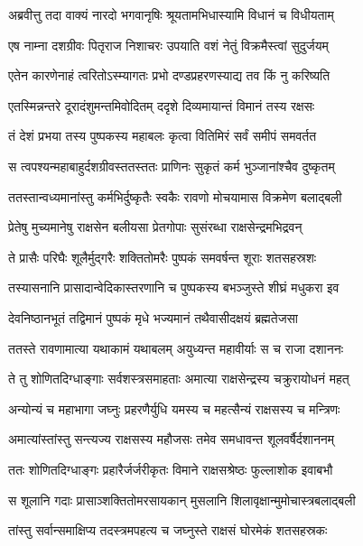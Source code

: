 \twolineshloka
{अब्रवीत्तु तदा वाक्यं नारदो भगवानृषिः}
{श्रूयतामभिधास्यामि विधानं च विधीयताम्} %

\twolineshloka
{एष नाम्ना दशग्रीवः पितृराज निशाचरः}
{उपयाति वशं नेतुं विक्रमैस्त्वां सुदुर्जयम्} %

\twolineshloka
{एतेन कारणेनाहं त्वरितोऽस्म्यागतः प्रभो}
{दण्डप्रहरणस्याद्य तव किं नु करिष्यति} %

\twolineshloka
{एतस्मिन्नन्तरे दूरादंशुमन्तमिवोदितम्}
{ददृशे दिव्यमायान्तं विमानं तस्य रक्षसः} %

\twolineshloka
{तं देशं प्रभया तस्य पुष्पकस्य महाबलः}
{कृत्वा वितिमिरं सर्वं समीपं समवर्तत} %

\twolineshloka
{स त्वपश्यन्महाबाहुर्दशग्रीवस्ततस्ततः}
{प्राणिनः सुकृतं कर्म भुञ्जानांश्चैव दुष्कृतम्} %

\twolineshloka
{ततस्तान्वध्यमानांस्तु कर्मभिर्दुष्कृतैः स्वकैः}
{रावणो मोचयामास विक्रमेण बलाद्बली} %

\twolineshloka
{प्रेतेषु मुच्यमानेषु राक्षसेन बलीयसा}
{प्रेतगोपाः सुसंरब्धा राक्षसेन्द्रमभिद्रवन्} %

\twolineshloka
{ते प्रासैः परिघैः शूलैर्मुद्गरैः शक्तितोमरैः}
{पुष्पकं समवर्षन्त शूराः शतसहस्रशः} %

\twolineshloka
{तस्यासनानि प्रासादान्वेदिकास्तरणानि च}
{पुष्पकस्य बभञ्जुस्ते शीघ्रं मधुकरा इव} %

\twolineshloka
{देवनिष्ठानभूतं तद्विमानं पुष्पकं मृधे}
{भज्यमानं तथैवासीदक्षयं ब्रह्मतेजसा} %

\twolineshloka
{ततस्ते रावणामात्या यथाकामं यथाबलम्}
{अयुध्यन्त महावीर्याः स च राजा दशाननः} %

\twolineshloka
{ते तु शोणितदिग्धाङ्गाः सर्वशस्त्रसमाहताः}
{अमात्या राक्षसेन्द्रस्य चक्रुरायोधनं महत्} %

\twolineshloka
{अन्योन्यं च महाभागा जघ्नुः प्रहरणैर्युधि}
{यमस्य च महत्सैन्यं राक्षसस्य च मन्त्रिणः} %

\twolineshloka
{अमात्यांस्तांस्तु सन्त्यज्य राक्षसस्य महौजसः}
{तमेव समधावन्त शूलवर्षैर्दशाननम्} %

\twolineshloka
{ततः शोणितदिग्धाङ्गः प्रहारैर्जर्जरीकृतः}
{विमाने राक्षसश्रेष्ठः फुल्लाशोक इवाबभौ} %

\twolineshloka
{स शूलानि गदाः प्रासाञ्शक्तितोमरसायकान्}
{मुसलानि शिलावृक्षान्मुमोचास्त्रबलाद्बली} %

\twolineshloka
{तांस्तु सर्वान्समाक्षिप्य तदस्त्रमपहत्य च}
{जघ्नुस्ते राक्षसं घोरमेकं शतसहस्रकः} %

